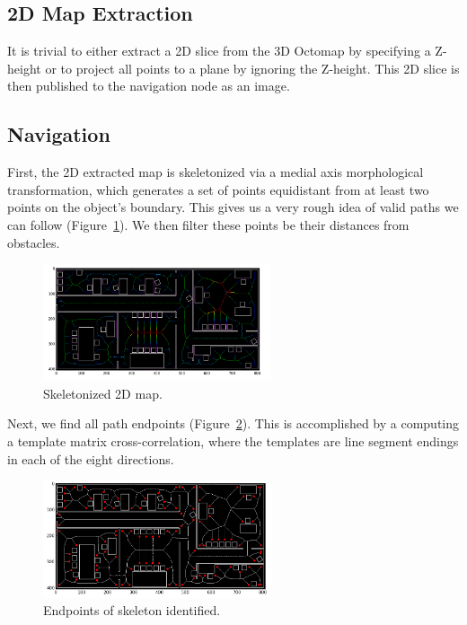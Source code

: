 \documentclass[12pt,letterpaper]{article} \usepackage[margin=1in]{geometry}
\begin{document}
\subsection*{2D Map Extraction}

It is trivial to either extract a 2D slice from the 3D Octomap by specifying
a Z-height or to project all points to a plane by ignoring the Z-height. This
2D slice is then published to the navigation node as an image.


\subsection*{Navigation}

First, the 2D extracted map is skeletonized via a medial axis morphological
transformation, which generates a set of points equidistant from at least two
points on the object's boundary. This gives us a very rough idea of valid paths
we can follow (Figure~\ref{fig:medial_axis}). We then filter these points be
their distances from obstacles.

\begin{figure}[!h]
	\centering
	\includegraphics[width=0.6\textwidth]{img/medial_axis.png}
	\caption{Skeletonized 2D map.}
	\label{fig:medial_axis}
\end{figure}

Next, we find all path endpoints (Figure~\ref{fig:identify_endpoints}). This is
accomplished by a computing a template matrix cross-correlation, where the
templates are line segment endings in each of the eight directions.

\begin{figure}[!h]
	\centering
	\includegraphics[width=0.6\textwidth]{img/identify_endpoints.png}
	\caption{Endpoints of skeleton identified.}
	\label{fig:identify_endpoints}
\end{figure}
\end{document}

